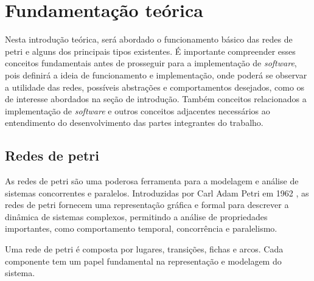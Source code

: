\chapter{Fundamentação teórica}

Nesta introdução teórica, será abordado o funcionamento básico das redes de petri e alguns dos principais tipos existentes. É importante compreender esses conceitos fundamentais antes de prosseguir para a implementação de \textit{software}, pois definirá a ideia de funcionamento e implementação, onde poderá se observar a utilidade das redes, possíveis abstrações e comportamentos desejados, como os de interesse abordados na seção de introdução. Também conceitos relacionados a implementação de \textit{software} e outros conceitos adjacentes necessários ao entendimento do desenvolvimento das partes integrantes do trabalho.

\section{Redes de petri}

As redes de petri são uma poderosa ferramenta para a modelagem e análise de sistemas concorrentes e paralelos. Introduzidas por Carl Adam Petri em 1962 \cite{carlpetri}, as redes de petri fornecem uma representação gráfica e formal para descrever a dinâmica de sistemas complexos, permitindo a análise de propriedades importantes, como comportamento temporal, concorrência e paralelismo.

Uma rede de petri é composta por lugares, transições, fichas e arcos. Cada componente tem um papel fundamental na representação e modelagem do sistema.


